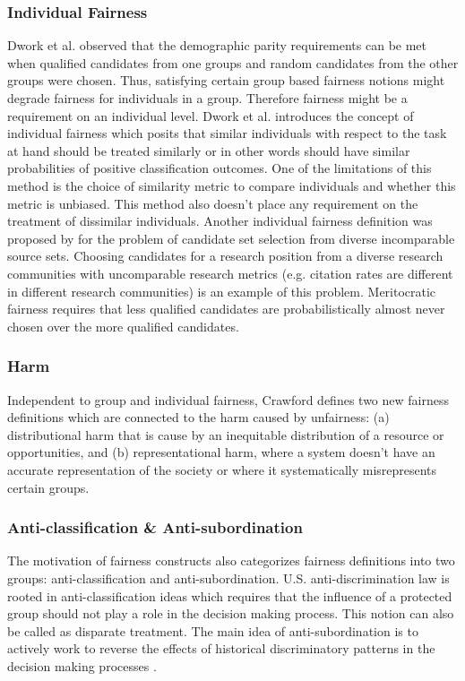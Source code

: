 \subsubsection{Individual Fairness}
Dwork et al. \cite{Dwork2012individual} observed that the demographic parity requirements can be met when qualified candidates from one groups and random candidates from the other groups were chosen. Thus, satisfying certain group based fairness notions might degrade fairness for individuals in a group. Therefore fairness might be a requirement on an individual level.
Dwork et al. \cite{Dwork2012individual} introduces the concept of individual fairness \cite{Dwork2012individual} which posits that similar individuals with respect to the task at hand should be treated similarly or in other words should have similar probabilities of positive classification outcomes. One of the limitations of this method is the choice of similarity metric to compare individuals and whether this metric is unbiased. This method also doesn't place any requirement on the treatment of dissimilar individuals.
Another individual fairness definition was proposed by \cite{pmlr-v70-kearns17a} for the problem of candidate set selection from diverse incomparable source sets. Choosing candidates for a research position from a diverse research communities with uncomparable research metrics (e.g. citation rates are different in different research communities) is an example of this problem. Meritocratic fairness requires that less qualified candidates are probabilistically almost never chosen over the more qualified candidates.

\subsubsection{Harm}
Independent to group and individual fairness, Crawford \cite{crawford2017trouble} defines two new fairness definitions which are connected to the harm caused by unfairness: (a) distributional harm that is cause by an inequitable distribution of a resource or opportunities, and (b) representational harm, where a system doesn't have an accurate representation of the society or where it systematically misrepresents certain groups.

\subsubsection{Anti-classification \& Anti-subordination}
The motivation of fairness constructs also categorizes fairness definitions into two groups: anti-classification and anti-subordination. U.S. anti-discrimination law is rooted in anti-classification ideas which requires that the influence of a protected group should not play a role in the decision making process. This notion can also be called as disparate treatment. The main idea of anti-subordination is to actively work to reverse the effects of historical discriminatory patterns in the decision making processes \cite{barocas2016big}.

